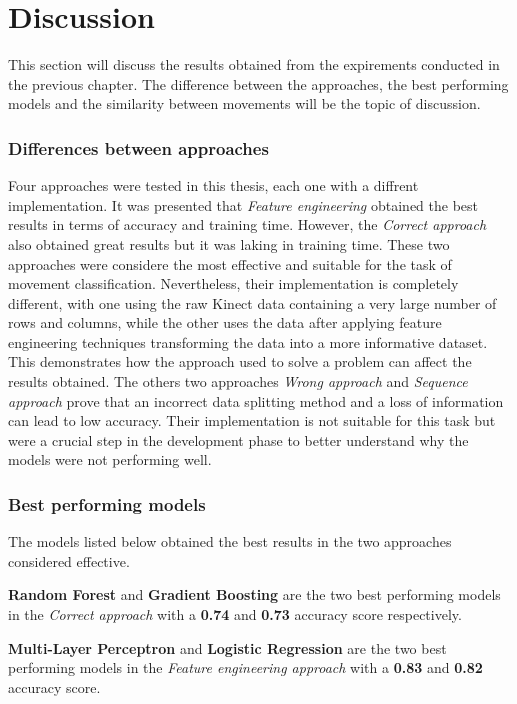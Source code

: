 \newpage
            
\section{Discussion}
        
        This section will discuss the results obtained from the expirements conducted in the previous chapter. The difference between the approaches, the best performing models and the similarity between movements will be the topic of discussion. 

        \subsubsection{Differences between approaches}
            Four approaches were tested in this thesis, each one with a diffrent implementation. It was presented that \textit{Feature engineering} obtained the best results in terms of accuracy and training time. However, the \textit{Correct approach} also obtained great results but it was laking in training time. These two approaches were considere the most effective and suitable for the task of movement classification. Nevertheless, their implementation is completely different, with one using the raw Kinect data containing a very large number of rows and columns, while the other uses the data after applying feature engineering techniques transforming the data into a more informative dataset. This demonstrates how the approach used to solve a problem can affect the results obtained. 
            The others two approaches \textit{Wrong approach} and \textit{Sequence approach}
            prove that an incorrect data splitting method and a loss of information can lead to low accuracy. Their implementation is not suitable for this task but were a crucial step in the development phase to better understand why the models were not performing well. 

        \subsubsection{Best performing models}
            The models listed below obtained the best results in the two approaches considered effective. 

            \begin{boxlabel}
                \item \textbf{Random Forest} and \textbf{Gradient Boosting} are the two best performing models in the \textit{Correct approach} with a \textbf{0.74} and \textbf{0.73} accuracy score respectively.
                \item \textbf{Multi-Layer Perceptron} and \textbf{Logistic Regression} are the two best performing models in the \textit{Feature engineering approach} with a \textbf{0.83} and \textbf{0.82} accuracy score.
            \end{boxlabel}

